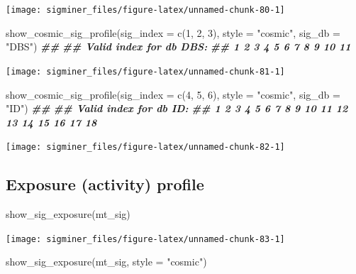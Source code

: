 \documentclass[
  12pt,
  a4paper,
  twoside]{book}
\newenvironment{Shaded}{\begin{snugshade}}{\end{snugshade}}
\newcommand{\AttributeTok}[1]{\textcolor[rgb]{0.77,0.63,0.00}{#1}}
\newcommand{\DecValTok}[1]{\textcolor[rgb]{0.00,0.00,0.81}{#1}}
\newcommand{\DocumentationTok}[1]{\textcolor[rgb]{0.56,0.35,0.01}{\textbf{\textit{#1}}}}
\newcommand{\FunctionTok}[1]{\textcolor[rgb]{0.00,0.00,0.00}{#1}}
\newcommand{\NormalTok}[1]{#1}
\newcommand{\StringTok}[1]{\textcolor[rgb]{0.31,0.60,0.02}{#1}}
\begin{document}
\texttt{[image: sigminer\_files/figure-latex/unnamed-chunk-80-1]}

\begin{Shaded}
\begin{Highlighting}[]
\FunctionTok{show\_cosmic\_sig\_profile}\NormalTok{(}\AttributeTok{sig\_index =} \FunctionTok{c}\NormalTok{(}\DecValTok{1}\NormalTok{, }\DecValTok{2}\NormalTok{, }\DecValTok{3}\NormalTok{), }\AttributeTok{style =} \StringTok{"cosmic"}\NormalTok{, }\AttributeTok{sig\_db =} \StringTok{"DBS"}\NormalTok{)}
\DocumentationTok{\#\# }
\DocumentationTok{\#\# Valid index for db \textquotesingle{}DBS\textquotesingle{}:}
\DocumentationTok{\#\# 1 2 3 4 5 6 7 8 9 10 11}
\end{Highlighting}
\end{Shaded}

\texttt{[image: sigminer\_files/figure-latex/unnamed-chunk-81-1]}

\begin{Shaded}
\begin{Highlighting}[]
\FunctionTok{show\_cosmic\_sig\_profile}\NormalTok{(}\AttributeTok{sig\_index =} \FunctionTok{c}\NormalTok{(}\DecValTok{4}\NormalTok{, }\DecValTok{5}\NormalTok{, }\DecValTok{6}\NormalTok{), }\AttributeTok{style =} \StringTok{"cosmic"}\NormalTok{, }\AttributeTok{sig\_db =} \StringTok{"ID"}\NormalTok{)}
\DocumentationTok{\#\# }
\DocumentationTok{\#\# Valid index for db \textquotesingle{}ID\textquotesingle{}:}
\DocumentationTok{\#\# 1 2 3 4 5 6 7 8 9 10 11 12 13 14 15 16 17 18}
\end{Highlighting}
\end{Shaded}

\texttt{[image: sigminer\_files/figure-latex/unnamed-chunk-82-1]}

\hypertarget{exposure-activity-profile}{%
\subsection{Exposure (activity) profile}\label{exposure-activity-profile}}

\begin{Shaded}
\begin{Highlighting}[]
\FunctionTok{show\_sig\_exposure}\NormalTok{(mt\_sig)}
\end{Highlighting}
\end{Shaded}

\texttt{[image: sigminer\_files/figure-latex/unnamed-chunk-83-1]}

\begin{Shaded}
\begin{Highlighting}[]
\FunctionTok{show\_sig\_exposure}\NormalTok{(mt\_sig, }\AttributeTok{style =} \StringTok{"cosmic"}\NormalTok{)}
\end{Highlighting}
\end{Shaded}
\end{document}
